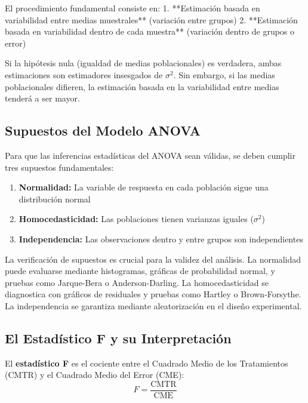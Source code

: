 El procedimiento fundamental consiste en:
1. **Estimación basada en variabilidad entre medias muestrales** (variación entre grupos)
2. **Estimación basada en variabilidad dentro de cada muestra** (variación dentro de grupos o error)

Si la hipótesis nula (igualdad de medias poblacionales) es verdadera, ambas estimaciones son estimadores insesgados de $\sigma^2$. Sin embargo, si las medias poblacionales difieren, la estimación basada en la variabilidad entre medias tenderá a ser mayor.

\subsection{Supuestos del Modelo ANOVA}

\begin{definition}
Para que las inferencias estadísticas del ANOVA sean válidas, se deben cumplir tres supuestos fundamentales:
\begin{enumerate}
    \item \textbf{Normalidad:} La variable de respuesta en cada población sigue una distribución normal
    \item \textbf{Homocedasticidad:} Las poblaciones tienen varianzas iguales ($\sigma^2$)
    \item \textbf{Independencia:} Las observaciones dentro y entre grupos son independientes
\end{enumerate}
\end{definition}

\begin{remark}
La verificación de supuestos es crucial para la validez del análisis. La normalidad puede evaluarse mediante histogramas, gráficas de probabilidad normal, y pruebas como Jarque-Bera o Anderson-Darling. La homocedasticidad se diagnostica con gráficos de residuales y pruebas como Hartley o Brown-Forsythe. La independencia se garantiza mediante aleatorización en el diseño experimental.
\end{remark}

\subsection{El Estadístico F y su Interpretación}

\begin{definition}
El \textbf{estadístico F} es el cociente entre el Cuadrado Medio de los Tratamientos (CMTR) y el Cuadrado Medio del Error (CME):
\[
F = \frac{\text{CMTR}}{\text{CME}}
\]
\end{definition}

